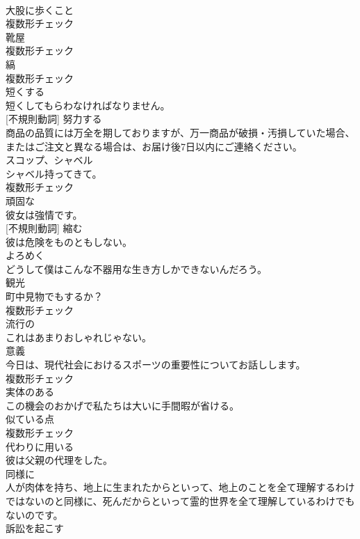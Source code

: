 \documentclass[8pt]{extreport}
\begin{document}
\begin{CJK}{UTF8}{min}
\\	[名詞]	大股に歩くこと	
\\	複数形チェック
\\	[名詞]	靴屋	
\\	複数形チェック
\\	[名詞]	縞	
\\	複数形チェック
\\	[動詞]	短くする	
\\	短くしてもらわなければなりません。	
\\	[動詞] [不規則動詞]	努力する	
\\	商品の品質には万全を期しておりますが、万一商品が破損・汚損していた場合、またはご注文と異なる場合は、お届け後7日以内にご連絡ください。	
\\	[名詞]	スコップ、シャベル	
\\	シャベル持ってきて。	
\\	複数形チェック
\\	[形容詞]	頑固な	
\\	彼女は強情です。	
\\	[動詞] [不規則動詞]	縮む	
\\	彼は危険をものともしない。	
\\	[動詞]	よろめく	
\\	どうして僕はこんな不器用な生き方しかできないんだろう。	
\\	[名詞]	観光	
\\	町中見物でもするか？	
\\	複数形チェック
\\	[形容詞]	流行の	
\\	これはあまりおしゃれじゃない。	
\\	[名詞]	意義	
\\	今日は、現代社会におけるスポーツの重要性についてお話しします。	
\\	複数形チェック
\\	[形容詞]	実体のある	
\\	この機会のおかげで私たちは大いに手間暇が省ける。	
\\	[名詞]	似ている点	
\\	複数形チェック
\\	[動詞]	代わりに用いる	
\\	彼は父親の代理をした。	
\\	[副詞]	同様に	
\\	人が肉体を持ち、地上に生まれたからといって、地上のことを全て理解するわけではないのと同様に、死んだからといって霊的世界を全て理解しているわけでもないのです。	
\\	[動詞]	訴訟を起こす	

\end{CJK}
\end{document}
